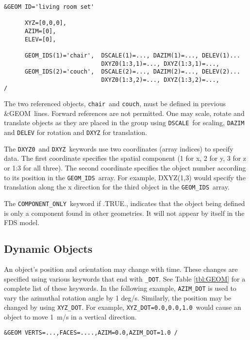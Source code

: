\documentclass[12pt]{article}
\begin{document}
{%
\begin{verbatim}
&GEOM ID='living room set'

      XYZ=[0,0,0],
      AZIM=[0],
      ELEV=[0],

      GEOM_IDS(1)='chair',  DSCALE(1)=..., DAZIM(1)=..., DELEV(1)...
                            DXYZ0(1:3,1)=..., DXYZ(1:3,1)=...,
      GEOM_IDS(2)='couch',  DSCALE(2)=..., DAZIM(2)=..., DELEV(2)...
                            DXYZ0(1:3,2)=..., DXYZ(1:3,2)=...,
/
\end{verbatim}
}

\noindent The two referenced objects, {\tt chair}\ and {\tt couch}, must be defined in
previous {\&GEOM}\ lines.  Forward references are not permitted.
One may scale, rotate and translate objects as they are placed in the group using
{\tt DSCALE}\, for scaling, {\tt DAZIM} and {\tt DELEV} for rotation and {\tt DXYZ} for translation.

The {\tt DXYZ0}\ and {\tt DXYZ}\ keywords use two coordinates (array indices) to specify data.
The first coordinate specifies the spatial component (1 for x, 2 for y, 3 for z or 1:3 for all three).
The second coordinate specifies the object number according to its position in the {\tt GEOM\_IDS}\ array. 
For example,
DXYZ(1,3) would specify the translation along the x direction for the third object in the {\tt GEOM\_IDS}\ array.

The {\tt COMPONENT\_ONLY}\ keyword if .TRUE., indicates that the object being defined is only a component found in other geometries.
It will not appear by itself in the FDS model.

\subsection{Dynamic Objects}
An object's position and orientation may change with time. 
These changes are specified using various keywords that end with {\tt \_DOT}.
See Table \ref{tbl:GEOM} for a complete list of these keywords.
In the following example, {\tt AZIM\_DOT} is used to vary the azimuthal rotation angle by 1 deg/s.
Similarly, the position may be changed by using {\tt XYZ\_DOT}.
For example, {\tt XYZ\_DOT=0.0,0.0,1.0}\ would cause an object to move 1~m/s in a vertical direction.
\begin{verbatim}
&GEOM VERTS=...,FACES=....,AZIM=0.0,AZIM_DOT=1.0 /
\end{verbatim}

\vspace{\baselineskip}
\end{document}
